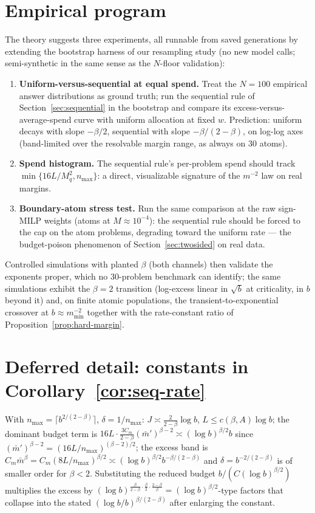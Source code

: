\documentclass[11pt]{article}
\newcommand{\nmax}{n_{\max}}
\newcommand{\mmin}{m_{\min}}
\begin{document}
\section{Empirical program}
\label{sec:empirics}

The theory suggests three experiments, all runnable from saved generations
by extending the bootstrap harness of our resampling study (no new model
calls; semi-synthetic in the same sense as the $N$-floor validation):

\begin{enumerate}
\item \textbf{Uniform-versus-sequential at equal spend.}  Treat the $N=100$
empirical answer distributions as ground truth; run the sequential rule of
Section~\ref{sec:sequential} in the bootstrap and compare its excess-versus-
average-spend curve with uniform allocation at fixed $w$.  Prediction:
uniform decays with slope $-\beta/2$, sequential with slope
$-\beta/(2-\beta)$, on log-log axes (band-limited over the resolvable margin
range, as always on $30$ atoms).
\item \textbf{Spend histogram.}  The sequential rule's per-problem spend
should track $\min\{16L/M_q^2,\nmax\}$: a direct, visualizable signature of
the $m^{-2}$ law on real margins.
\item \textbf{Boundary-atom stress test.}  Run the same comparison at the
raw sign-MILP weights (atoms at $M\approx10^{-4}$): the sequential rule
should be forced to the cap on the atom problems, degrading toward the
uniform rate --- the budget-poison phenomenon of Section~\ref{sec:twosided}
on real data.
\end{enumerate}

Controlled simulations with planted $\beta$ (both channels) then validate
the exponents proper, which no $30$-problem benchmark can identify; the
same simulations exhibit the $\beta=2$ transition (log-excess linear in
$\sqrt b$ at criticality, in $b$ beyond it) and, on finite atomic
populations, the transient-to-exponential crossover at $b\approx\mmin^{-2}$
together with the rate-constant ratio of
Proposition~\ref{prop:hard-margin}.

\appendix

\section{Deferred detail: constants in Corollary~\ref{cor:seq-rate}}
With $\nmax=\lceil b^{2/(2-\beta)}\rceil$, $\delta=1/\nmax$:
$J\asymp\frac{2}{2-\beta}\log b$, $L\le c(\beta,A)\log b$;
the dominant budget term is
$16L\cdot\frac{3C_m}{2-\beta}(\bar m')^{\beta-2}
\asymp(\log b)^{\beta/2}b$ since
$(\bar m')^{\beta-2}=(16L/\nmax)^{(\beta-2)/2}$; the excess band is
$C_m\bar m^\beta=C_m(8L/\nmax)^{\beta/2}
\asymp(\log b)^{\beta/2}b^{-\beta/(2-\beta)}$ and
$\delta=b^{-2/(2-\beta)}$ is of smaller order for $\beta<2$.  Substituting
the reduced budget $b/(C(\log b)^{\beta/2})$ multiplies the excess by
$(\log b)^{\frac{\beta}{2-\beta}\cdot\frac{\beta}{2}\cdot\frac{2-\beta}{\beta}}
=(\log b)^{\beta/2}$-type factors that collapse into the stated
$(\log b/b)^{\beta/(2-\beta)}$ after enlarging the constant.
\end{document}
